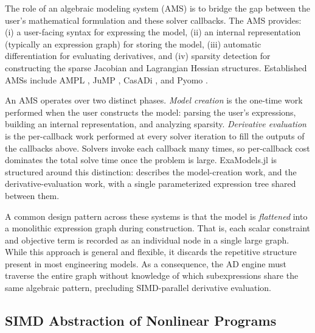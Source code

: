 \documentclass[11pt]{article}
\begin{document}
The role of an algebraic modeling system (AMS) is to bridge the gap between the user's mathematical formulation and these solver callbacks. The AMS provides: (i) a user-facing syntax for expressing the model, (ii) an internal representation (typically an expression graph) for storing the model, (iii) automatic differentiation for evaluating derivatives, and (iv) sparsity detection for constructing the sparse Jacobian and Lagrangian Hessian structures. Established AMSs include AMPL \citep{fourerModelingLanguageMathematical1990}, JuMP \citep{lubinJuMP10Recent2023}, CasADi \citep{anderssonCasADiSoftwareFramework2019}, and Pyomo \citep{hartPyomoModelingSolving2011}.

An AMS operates over two distinct phases. \emph{Model creation} is the one-time work performed when the user constructs the model: parsing the user's expressions, building an internal representation, and analyzing sparsity. \emph{Derivative evaluation} is the per-callback work performed at every solver iteration to fill the outputs of the callbacks above. Solvers invoke each callback many times, so per-callback cost dominates the total solve time once the problem is large. ExaModels.jl is structured around this distinction:  describes the model-creation work, and  the derivative-evaluation work, with a single parameterized expression tree shared between them.

A common design pattern across these systems is that the model is \emph{flattened} into a monolithic expression graph during construction. That is, each scalar constraint and objective term is recorded as an individual node in a single large graph. While this approach is general and flexible, it discards the repetitive structure present in most engineering models. As a consequence, the AD engine must traverse the entire graph without knowledge of which subexpressions share the same algebraic pattern, precluding SIMD-parallel derivative evaluation.

\subsection{SIMD Abstraction of Nonlinear Programs}
\label{sec:modeling:simd}
\end{document}

